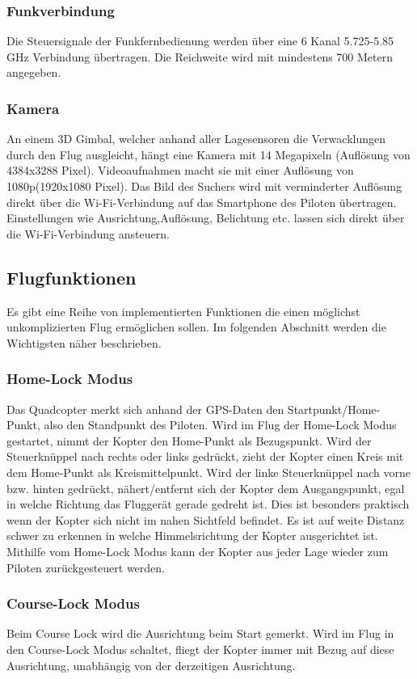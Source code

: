 \subsubsection*{Funkverbindung}
Die Steuersignale der Funkfernbedienung werden über eine 6 Kanal 5.725-5.85 GHz Verbindung übertragen. Die Reichweite wird mit mindestens 700 Metern angegeben.
\subsubsection*{Kamera}
An einem 3D Gimbal, welcher anhand aller Lagesensoren die Verwacklungen durch den Flug ausgleicht, hängt eine Kamera mit 14 Megapixeln (Auflösung von 4384x3288 Pixel). Videoaufnahmen macht sie mit einer Auflösung von 1080p(1920x1080 Pixel). Das Bild des Suchers wird mit verminderter Auflösung direkt über die Wi-Fi-Verbindung auf das Smartphone des Piloten übertragen. Einstellungen wie Ausrichtung,Auflösung, Belichtung etc. lassen sich direkt über die Wi-Fi-Verbindung ansteuern.\\
\subsection{Flugfunktionen\cite{phantom}}
Es gibt eine Reihe von implementierten Funktionen die einen möglichst unkomplizierten Flug ermöglichen sollen. Im folgenden Abschnitt werden die Wichtigsten näher beschrieben.
\subsubsection*{Home-Lock Modus}
Das Quadcopter merkt sich anhand der GPS-Daten den Startpunkt/Home-Punkt, also den Standpunkt des Piloten. Wird im Flug der Home-Lock Modus gestartet, nimmt der Kopter den Home-Punkt als Bezugspunkt. Wird der Steuerknüppel nach rechts oder links gedrückt, zieht der Kopter einen Kreis mit dem Home-Punkt als Kreismittelpunkt. Wird der linke Steuerknüppel nach vorne bzw. hinten gedrückt, nähert/entfernt sich der Kopter dem Ausgangspunkt, egal in welche Richtung das Fluggerät gerade gedreht ist. Dies ist besonders praktisch wenn der Kopter sich nicht im nahen Sichtfeld befindet. Es ist auf weite Distanz schwer zu erkennen in welche Himmelsrichtung der Kopter ausgerichtet ist. Mithilfe vom Home-Lock Modus kann der Kopter aus jeder Lage wieder zum Piloten zurückgesteuert werden.
\subsubsection*{Course-Lock Modus}
Beim Course Lock wird die Ausrichtung beim Start gemerkt. Wird im Flug in den Course-Lock Modus schaltet, fliegt der Kopter immer mit Bezug auf diese Ausrichtung, unabhängig von der derzeitigen Ausrichtung.\\
